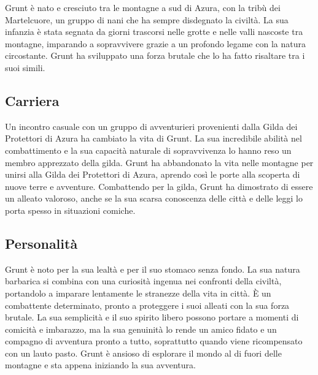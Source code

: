 Grunt è nato e cresciuto tra le montagne a sud di Azura, con la tribù
dei Martelcuore, un gruppo di nani che ha sempre disdegnato la civiltà.
La sua infanzia è stata segnata da giorni trascorsi nelle grotte e nelle
valli nascoste tra montagne, imparando a sopravvivere grazie a un
profondo legame con la natura circostante. Grunt ha sviluppato una forza
brutale che lo ha fatto risaltare tra i suoi simili.

\subsection{Carriera}\label{carriera}


Un incontro casuale con un gruppo di avventurieri provenienti dalla
Gilda dei Protettori di Azura ha cambiato la vita di Grunt. La sua
incredibile abilità nel combattimento e la sua capacità naturale di
sopravvivenza lo hanno reso un membro apprezzato della gilda. Grunt ha
abbandonato la vita nelle montagne per unirsi alla Gilda dei Protettori
di Azura, aprendo così le porte alla scoperta di nuove terre e
avventure. Combattendo per la gilda, Grunt ha dimostrato di essere un
alleato valoroso, anche se la sua scarsa conoscenza delle città e delle
leggi lo porta spesso in situazioni comiche.

\subsection{Personalità}\label{personalituxe0}

Grunt è noto per la sua lealtà e per il suo stomaco senza fondo. La sua
natura barbarica si combina con una curiosità ingenua nei confronti
della civiltà, portandolo a imparare lentamente le stranezze della vita
in città. È un combattente determinato, pronto a proteggere i suoi
alleati con la sua forza brutale. La sua semplicità e il suo spirito
libero possono portare a momenti di comicità e imbarazzo, ma la sua
genuinità lo rende un amico fidato e un compagno di avventura pronto a
tutto, soprattutto quando viene ricompensato con un lauto pasto. Grunt è
ansioso di esplorare il mondo al di fuori delle montagne e sta appena
iniziando la sua avventura.


